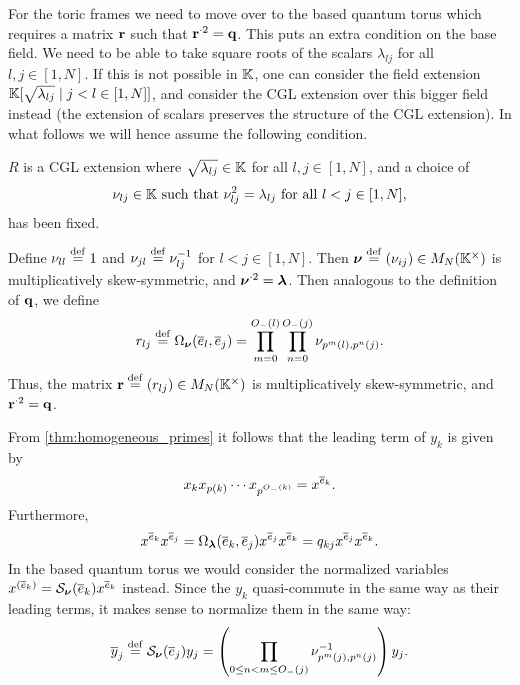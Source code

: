 \medskip

For the toric frames we need to move over to the based quantum torus which requires a
matrix $\mathbf{r}$ such that $\mathbf{r}^{\cdot 2} = \mathbf{q}$. This puts an extra condition on the
base field. We need to be able to take square roots of the scalars $\lambda_{lj}$ for
all $l,j \in [1, N]$. If this is not possible in $\mathbb{K}$, one can consider the field
extension $\mathbb{K}[\sqrt{\lambda_{lj}} \mid j < l \in [1, N]]$, and consider the CGL
extension over this bigger field instead (the extension of scalars preserves the
structure of the CGL extension). In what follows we will hence assume the following
condition.

\begin{condition}\label{cond:square_roots}
	$R$ is a CGL extension where $\sqrt{\lambda_{lj}} \in \mathbb{K}$ for all
	$l, j \in [1, N]$, and a choice of
	\begin{equation*}
		\nu_{lj} \in \mathbb{K} \text{ such that } \nu^2_{lj} = \lambda_{lj}\text{ for all } l < j \in [1,N],
	\end{equation*}
	has been fixed.
\end{condition}

Define $\nu_{ll} \overset{\mathrm{def}}{=} 1$ and $\nu_{jl} \overset{\mathrm{def}}{=} \nu_{lj}^{-1}$ for $l < j \in [1, N]$.
Then $\boldsymbol{\nu} \overset{\mathrm{def}}{=} (\nu_{ij}) \in M_N(\mathbb{K}^\times)$ is multiplicatively
skew-symmetric, and $\boldsymbol{\nu}^{\cdot 2} = \boldsymbol{\lambda}$. Then analogous to the
definition of $\mathbf{q}$, we define
\begin{equation*}
	r_{lj} \overset{\mathrm{def}}{=} \Omega_{\boldsymbol{\nu}}(\overline{e}_l, \overline{e}_j) = \prod_{m=0}^{O_{-}(l)}\prod_{n=0}^{O_{-}(j)}\nu_{p^m(l), p^n(j)}.
\end{equation*}
%
Thus, the matrix $\mathbf{r} \overset{\mathrm{def}}{=} (r_{lj}) \in M_N(\mathbb{K}^\times)$ is
multiplicatively skew-symmetric, and $\mathbf{r}^{\cdot 2} = \mathbf{q}$.

From \cref{thm:homogeneous_primes} it follows that the leading term of $y_k$ is given
by
\begin{equation*}
	x_k x_{p(k)} \cdots x_{p^{O_{-}(k)}} = x^{\overline{e}_k}.
\end{equation*}
%
Furthermore,
\begin{equation*}
	x^{\overline{e}_k}x^{\overline{e}_j} = \Omega_{\boldsymbol{\lambda}}(\overline{e}_k, \overline{e}_j)x^{\overline{e}_j}x^{\overline{e}_k} = q_{kj}x^{\overline{e}_j}x^{\overline{e}_k}.
\end{equation*}
%
In the based quantum torus we would consider the normalized variables $x^{(\overline{e}_k)} =
	\mathcal{S}_{\boldsymbol{\nu}}(\overline{e}_k)x^{\overline{e}_k}$ instead. Since the $y_k$ quasi-commute in the same way as
their leading terms, it makes sense to normalize them in the same way:
\begin{equation}\label{eq:normalization_y}
	\overline{y}_j \overset{\mathrm{def}}{=} \mathcal{S}_{\boldsymbol{\nu}}(\overline{e}_j) y_j = \left(\prod_{0 \leq n < m \leq O_{-}(j)}\nu^{-1}_{p^m(j),p^n(j)}\right) y_j.
\end{equation}

